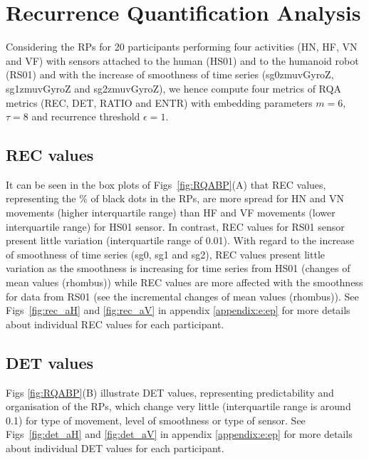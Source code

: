 \newpage
\section{Recurrence Quantification Analysis} \label{ch6:rqas}
Considering the RPs for 20 participants performing four activities 
(HN, HF, VN and VF) with sensors attached to the human (HS01) and to the 
humanoid robot (RS01) and with the increase of smoothness of time series 
(sg0zmuvGyroZ, sg1zmuvGyroZ and sg2zmuvGyroZ), 
we hence compute four metrics of RQA metrics (REC, DET, RATIO and ENTR) with 
embedding parameters $m=6$, $\tau=8$ and recurrence threshold $\epsilon=1$.
 

\subsection*{REC values}
It can be seen in the box plots of Figs~\ref{fig:RQABP}(A) that REC values, 
representing the \% of black dots in the RPs, 
are more spread for HN and VN movements (higher interquartile range) 
than HF and VF movements (lower interquartile range) for HS01 sensor. 
In contrast, REC values for RS01 sensor present little variation 
(interquartile range of 0.01).
With regard to the increase of smoothness of time series 
(sg0, sg1 and sg2), REC values present little 
variation as the smoothness is increasing for time series from HS01 
(changes of mean values (rhombus)) while REC values are more affected with 
the smoothness for data from RS01 
(see the incremental changes of mean values (rhombus)).
See Figs~\ref{fig:rec_aH} and \ref{fig:rec_aV} in appendix \ref{appendix:e:ep} 
for more details about individual REC values for each participant.
%


\subsection*{DET values}
Figs \ref{fig:RQABP}(B) illustrate DET values, 
representing predictability and organisation of the RPs, 
which change very little (interquartile range is around 0.1) 
for type of movement, level of smoothness or type of sensor.
See Figs~\ref{fig:det_aH} and \ref{fig:det_aV} in appendix \ref{appendix:e:ep} 
for more details about individual DET values for each participant.
%

